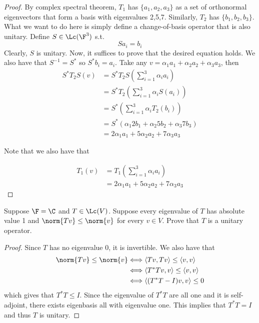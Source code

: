\documentclass{extarticle}
\begin{document}
\begin{proof}
By complex spectral theorem, \(T_1\) has \(\{a_1, a_2, a_3\}\) as a set of orthonormal eigenvectors that
form a basis with eigenvalues 2,5,7. Similarly, \(T_2\) has \(\{b_1, b_2, b_3\}\). What we want to
do here is simply define a change-of-basis operator that is also unitary. Define \(S \in \Lc(\F^3)\) s.t.
\[S a_i = b_i\]
Clearly, \(S\) is unitary. Now, it suffices to prove that the desired equation holds.
We also have that \(S^{-1} = S^* \) so \(S^* b_i = a_i\). Take any
\(v = \alpha_1 a_1 + \alpha_2 a_2 + \alpha_3 a_3\), then
\begin{align*}
    S^*T_2S (v)
    &= S^*T_2 S \left(\sum_{i=1}^{3} \alpha_i a_i \right) \\
    &= S^*T_2 \left( \sum_{i=1}^{3} \alpha_i S(a_i) \right) \\
    &= S^* \left(\sum_{i=1}^{3} \alpha_i T_2(b_i) \right) \\
    &= S^* (\alpha_1 2b_1 + \alpha_2 5b_2 + \alpha_3 7b_3) \\
    &= 2 \alpha_1 a_1 + 5 \alpha_2 a_2 + 7 \alpha_3 a_3
\end{align*}

Note that we also have that

\begin{align*}
    T_1 (v)
    &= T_1 \left(\sum_{i=1}^{3} \alpha_i a_i \right) \\
    &= 2\alpha_1 a_1 + 5 \alpha_2 a_2 + 7 \alpha_3 a_3
\end{align*}
\end{proof}

\begin{problem}{9}
    Suppose \(\F = \C\) and \(T \in \Lc(V)\). Suppose every eigenvalue of \(T\) has absolute value
    1 and \(\norm{Tv} \leq \norm{v}\) for every \(v \in V\). Prove that \(T\) is a unitary operator.
\end{problem}

\begin{proof}
Since \(T\) has no eigenvalue 0, it is invertible. We also have that
\begin{align*}
    \norm{Tv} \leq \norm{v}
    &\Longleftrightarrow \langle Tv,Tv \rangle \leq \langle v,v \rangle \\
    &\Longleftrightarrow \langle T^*T v,v \rangle \leq \langle v,v \rangle \\
    &\Longleftrightarrow \langle (T^* T - I)v,v \rangle \leq 0
\end{align*}
which gives that \(T^*T \leq I\). Since the eigenvalue of \(T^*T\) are all one and it is
self-adjoint, there exists eigenbasis all with eigenvalue one. This implies that \(T^*T = I\)
and thus \(T\) is unitary.
\end{proof}
\end{document}
